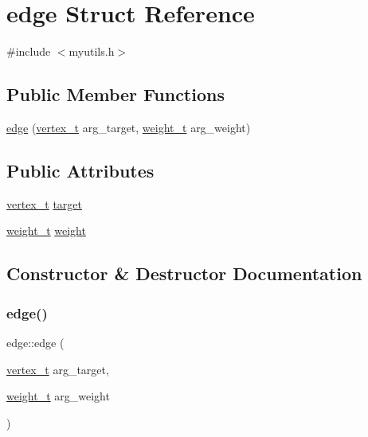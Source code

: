 \hypertarget{structedge}{}\section{edge Struct Reference}
\label{structedge}


{\ttfamily \#include $<$myutils.\+h$>$}

\subsection*{Public Member Functions}
\begin{DoxyCompactItemize}
\item 
\mbox{\hyperlink{structedge_a1fe79fe865f9765abd5e2263c0e249de}{edge}} (\mbox{\hyperlink{_a_star_shortest_path_finder_8h_a12260dc5cde4dd7254dc16896f69e810}{vertex\+\_\+t}} arg\+\_\+target, \mbox{\hyperlink{myutils_8h_a4497881a7e75868dd6b1cafbffd81e1f}{weight\+\_\+t}} arg\+\_\+weight)
\end{DoxyCompactItemize}
\subsection*{Public Attributes}
\begin{DoxyCompactItemize}
\item 
\mbox{\hyperlink{_a_star_shortest_path_finder_8h_a12260dc5cde4dd7254dc16896f69e810}{vertex\+\_\+t}} \mbox{\hyperlink{structedge_af8721d112f37e95c02f540569267848f}{target}}
\item 
\mbox{\hyperlink{myutils_8h_a4497881a7e75868dd6b1cafbffd81e1f}{weight\+\_\+t}} \mbox{\hyperlink{structedge_ade75f8405f0967b5ff9231d522806be2}{weight}}
\end{DoxyCompactItemize}


\subsection{Constructor \& Destructor Documentation}
\mbox{\label{structedge_a1fe79fe865f9765abd5e2263c0e249de}} 
\subsubsection{\texorpdfstring{edge()}{edge()}}
{\footnotesize\ttfamily edge\+::edge (\begin{DoxyParamCaption}\item[{\mbox{\hyperlink{_a_star_shortest_path_finder_8h_a12260dc5cde4dd7254dc16896f69e810}{vertex\+\_\+t}}}]{arg\+\_\+target,  }\item[{\mbox{\hyperlink{myutils_8h_a4497881a7e75868dd6b1cafbffd81e1f}{weight\+\_\+t}}}]{arg\+\_\+weight }\end{DoxyParamCaption})\hspace{0.3cm}{\ttfamily [inline]}}



